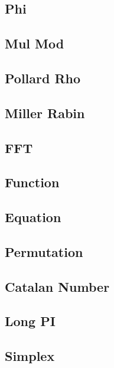 \documentclass[10pt,twocolumn,oneside]{article}
\begin{document}
    \subsection{Phi}
    
    \subsection{Mul Mod}
    
    \subsection{Pollard Rho}
    
    \subsection{Miller Rabin}
    
    \subsection{FFT}
    
    \subsection{Function}
    
    \subsection{Equation}
    
    \subsection{Permutation}
    
    \subsection{Catalan Number}
    
    \subsection{Long PI}
    
    \subsection{Simplex}
    
\end{document}
